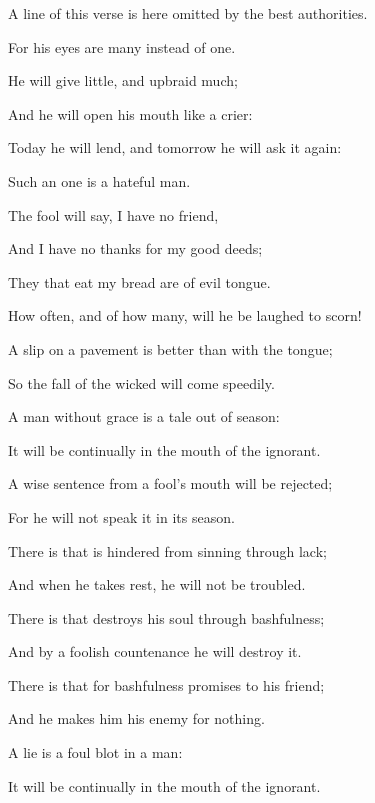 {{A line of this verse is here omitted by the best authorities.
}
\par }{\Q For his eyes are many instead of one.
\par }{\Q {}He will give little, and upbraid much;
\par }{\Q And he will open his mouth like a crier:
\par }{\Q Today he will lend, and tomorrow he will ask it again:
\par }{\Q Such an one is a hateful man.
\par }{\Q {}The fool will say, I have no friend,
\par }{\Q And I have no thanks for my good deeds;
\par }{\Q They that eat my bread are of evil tongue.
\par }{\Q {}How often, and of how many, will he be laughed to scorn!
\par }{\BB \par }{\Q {}A slip on a pavement is better than
{} with the tongue;
\par }{\Q So the fall of the wicked will come speedily.
\par }{\Q {}A man without grace is
{} a tale out of season:
\par }{\Q It will be continually in the mouth of the ignorant.
\par }{\Q {}A
 wise sentence from a fool’s mouth will be rejected;
\par }{\Q For he will not speak it in its season.
\par }{\BB \par }{\Q {}There is that is hindered from sinning through lack;
\par }{\Q And when he takes rest, he will not be troubled.
\par }{\Q {}There is that destroys his soul through bashfulness;
\par }{\Q And by a foolish countenance he will destroy it.
\par }{\Q {}There is that for bashfulness promises to his friend;
\par }{\Q And he makes him his enemy for nothing.
\par }{\BB \par }{\Q {}A lie is a foul blot in a man:
\par }{\Q It will be continually in the mouth of the ignorant.
}
